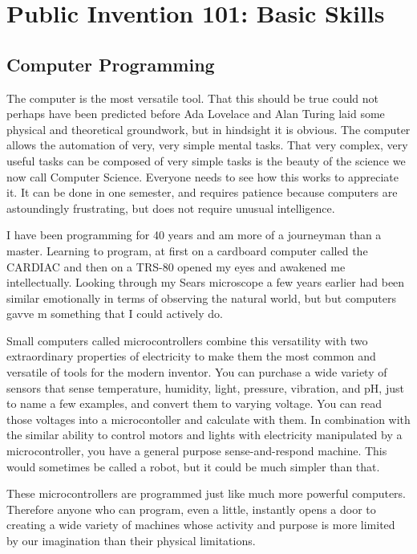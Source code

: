\documentclass[
	fontsize=10pt, %
	twoside=false, %
	secnumdepth=1, %
]{kaobook}
\begin{document}
\chapter{Public Invention 101: Basic Skills}

\section{Computer Programming}

The computer is the most versatile tool.
That this should be true could not perhaps have been predicted
before Ada Lovelace and Alan Turing laid some physical and
theoretical groundwork,
but in hindsight it is obvious.
The computer allows the automation of very, very simple
mental tasks.
That very complex, very useful tasks can be composed of very simple tasks
is the beauty of the science we now call Computer Science.
Everyone needs to see how this works to appreciate it.
It can be done in one semester, and requires patience
because computers are astoundingly frustrating, but
does not require unusual intelligence.

I have been programming for 40 years and am more
of a journeyman than a master.
Learning to program, at first on a cardboard computer
called the CARDIAC and then on a TRS-80
opened my eyes and awakened me intellectually.
Looking through my Sears microscope a few years earlier
had been similar emotionally in terms of observing
the natural world, but but computers gavve m something that
I could actively do.

Small computers called microcontrollers combine this
versatility with two extraordinary properties of electricity
to make them the most common and versatile of tools for the modern inventor.
You can purchase a wide variety of sensors that sense
temperature, humidity, light, pressure, vibration, and pH, just
to name a few examples, and convert them to varying voltage.
You can read those voltages into a microcontoller and calculate with them.
In combination with the similar ability to control motors and lights with
electricity manipulated by a microcontroller, you have a general
purpose sense-and-respond machine. This would sometimes be called a
robot, but it could be much simpler than that.

These microcontrollers are programmed just like much more powerful
computers. Therefore anyone who can program, even a little,
instantly opens a door to creating a wide variety of machines whose
activity and purpose is more limited by our imagination than their
physical limitations.
\end{document}
